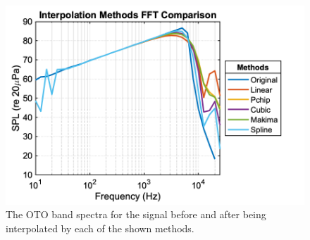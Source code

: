 \begin{figure}[htp]
    \centering
    \includegraphics[width = 6 in]{Chapters/Computational Methods/Figures/Interpolation Methods FFT Comparison.png}
    \caption{The OTO band spectra for the signal before and after being interpolated by each of the shown methods.}
    \label{fig:Interpolation Methods FFT Comparison}
\end{figure}